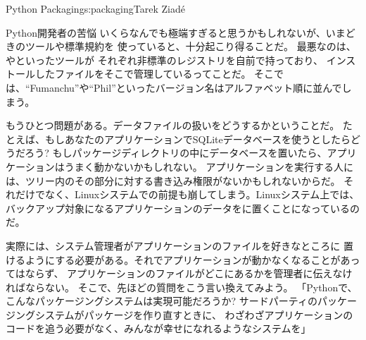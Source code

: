 \begin{aosachapter}{Python Packaging}{s:packaging}{Tarek Ziad\'{e}}
\begin{aosasect1}{Python開発者の苦悩}
いくらなんでも極端すぎると思うかもしれないが、いまどきのツールや標準規約を
使っていると、十分起こり得ることだ。
最悪なのは、やといったツールが
それぞれ非標準のレジストリを自前で持っており、
インストールしたファイルをそこで管理しているってことだ。
そこでは、``Fumanchu''や``Phil''といったバージョン名はアルファベット順に並んでしまう。

もうひとつ問題がある。データファイルの扱いをどうするかということだ。
たとえば、もしあなたのアプリケーションでSQLiteデータベースを使うとしたらどうだろう?
もしパッケージディレクトリの中にデータベースを置いたら、アプリケーションはうまく動かないかもしれない。
アプリケーションを実行する人には、ツリー内のその部分に対する書き込み権限がないかもしれないからだ。
それだけでなく、Linuxシステムでの前提も崩してしまう。Linuxシステム上では、
バックアップ対象になるアプリケーションのデータをに置くことになっているのだ。

実際には、システム管理者がアプリケーションのファイルを好きなところに
置けるようにする必要がある。それでアプリケーションが動かなくなることがあってはならず、
アプリケーションのファイルがどこにあるかを管理者に伝えなければならない。
そこで、先ほどの質問をこう言い換えてみよう。
「Pythonで、こんなパッケージングシステムは実現可能だろうか?
サードパーティのパッケージングシステムがパッケージを作り直すときに、
わざわざアプリケーションのコードを追う必要がなく、みんなが幸せになれるようなシステムを」


\end{aosasect1}
\end{aosachapter}

